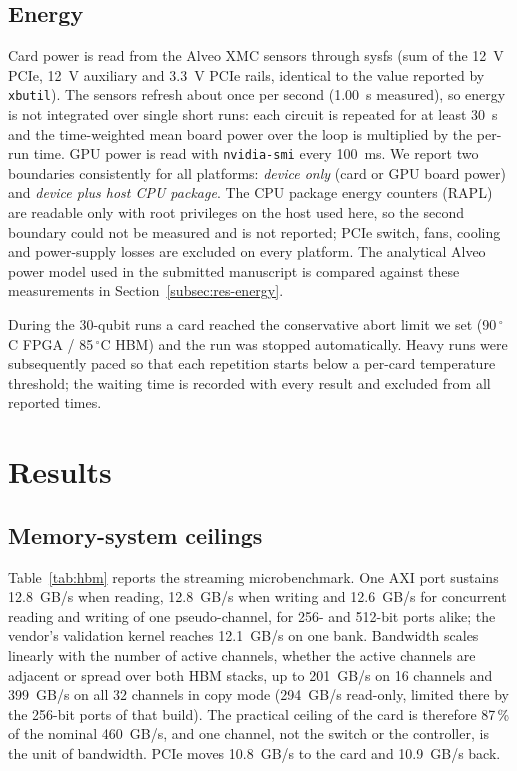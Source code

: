 \documentclass[pdflatex,sn-mathphys-num]{sn-jnl}
\newcommand{\NumHbmCeilingPct}{87}
\newcommand{\NumHbmSixteenCopy}{201}
\newcommand{\NumHbmSixteenPerCUCopy}{12.6}
\newcommand{\NumHbmSixteenPerCURead}{12.8}
\newcommand{\NumHbmSixteenPerCUWrite}{12.8}
\newcommand{\NumHbmThirtytwoCopy}{399}
\newcommand{\NumHbmThirtytwoRead}{294}
\newcommand{\NumHbmVendorOneBank}{12.1}
\newcommand{\NumPcieDtoH}{10.9}
\newcommand{\NumPcieHtoD}{10.8}
\newcommand{\NumXmcPeriod}{1.00}
\theoremstyle{thmstyleone}
\theoremstyle{thmstylethree}
\begin{document}
\subsection{Energy}\label{subsec:energy-method}

Card power is read from the Alveo XMC sensors through sysfs (sum of the 12~V PCIe, 12~V auxiliary and 3.3~V PCIe rails, identical to the value reported by \texttt{xbutil}). The sensors refresh about once per second (\NumXmcPeriod~s measured), so energy is not integrated over single short runs: each circuit is repeated for at least 30~s and the time-weighted mean board power over the loop is multiplied by the per-run time. GPU power is read with \texttt{nvidia-smi} every 100~ms. We report two boundaries consistently for all platforms: \emph{device only} (card or GPU board power) and \emph{device plus host CPU package}. The CPU package energy counters (RAPL) are readable only with root privileges on the host used here, so the second boundary could not be measured and is not reported; PCIe switch, fans, cooling and power-supply losses are excluded on every platform. The analytical Alveo power model used in the submitted manuscript is compared against these measurements in Section~\ref{subsec:res-energy}.

During the 30-qubit runs a card reached the conservative abort limit we set (90\,$^\circ$C FPGA / 85\,$^\circ$C HBM) and the run was stopped automatically. Heavy runs were subsequently paced so that each repetition starts below a per-card temperature threshold; the waiting time is recorded with every result and excluded from all reported times.
\section{Results}\label{sec:results}

\subsection{Memory-system ceilings}\label{subsec:res-ceilings}

Table~\ref{tab:hbm} reports the streaming microbenchmark. One AXI port sustains \NumHbmSixteenPerCURead~GB/s when reading, \NumHbmSixteenPerCUWrite~GB/s when writing and \NumHbmSixteenPerCUCopy~GB/s for concurrent reading and writing of one pseudo-channel, for 256- and 512-bit ports alike; the vendor's validation kernel reaches \NumHbmVendorOneBank~GB/s on one bank. Bandwidth scales linearly with the number of active channels, whether the active channels are adjacent or spread over both HBM stacks, up to \NumHbmSixteenCopy~GB/s on 16 channels and \NumHbmThirtytwoCopy~GB/s on all 32 channels in copy mode (\NumHbmThirtytwoRead~GB/s read-only, limited there by the 256-bit ports of that build). The practical ceiling of the card is therefore \NumHbmCeilingPct\,\% of the nominal 460~GB/s, and one channel, not the switch or the controller, is the unit of bandwidth. PCIe moves \NumPcieHtoD~GB/s to the card and \NumPcieDtoH~GB/s back.
\end{document}
